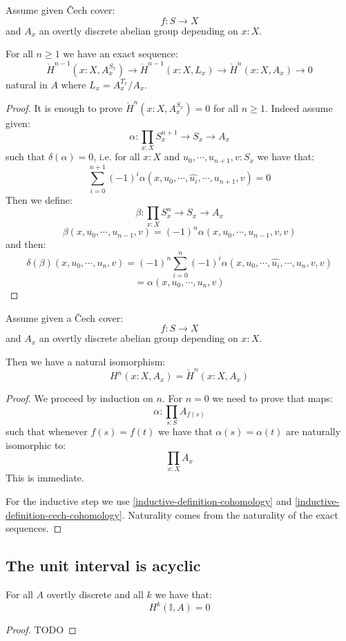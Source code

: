 \begin{lemma}\label{inductive-definition-cech-cohomology}
Assume given \v{C}ech cover:
\[f:S\to X\]
and $A_x$ an overtly discrete abelian group depending on $x:X$.

For all $n\geq 1$ we have an exact sequence:
\[\check{H}^{n-1}(x:X,A_x^{S_x}) \to \check{H}^{n-1}(x:X,L_x)\to \check{H}^n(x:X,A_x)\to 0\]
natural in $A$ where $L_x=A_x^{T_x}/A_x$.
\end{lemma}

\begin{proof}
It is enough to prove $\check{H}^n(x:X,A_x^{S_x}) = 0$ for all $n\geq 1$. Indeed assume given:
\[\alpha : \prod_{x:X} S_x^{n+1}\to S_x\to A_x\]
such that $\delta(\alpha) = 0$, i.e. for all $x:X$ and $u_0,\cdots, u_{n+1},v:S_x$ we have that:
\[\sum_{i=0}^{n+1}(-1)^i\alpha(x,u_0,\cdots,  \hat{u_i},\cdots ,u_{n+1},v) = 0\]
Then we define:
\[\beta : \prod_{x:X} S_x^{n}\to S_x\to A_x\]
\[\beta(x,u_0,\cdots,u_{n-1},v) = (-1)^n\alpha(x,u_0,\cdots,u_{n-1},v,v)\]
and then:
\[\delta(\beta)(x,u_0,\cdots,u_{n},v) = (-1)^n\sum_{i=0}^{n} (-1)^i \alpha(x,u_0,\cdots,\hat{u_i},\cdots,u_n,v,v) \]
\[= \alpha(x,u_0,\cdots,u_n,v)\]
\end{proof}

\begin{theorem}
Assume given a \v{C}ech cover:
\[f:S\to X\]
and $A_x$ an overtly discrete abelian group depending on $x:X$.

Then we have a natural isomorphism:
\[H^n(x:X,A_x) = \check{H}^n(x:X,A_x)\]
\end{theorem}

\begin{proof}
We proceed by induction on $n$. For $n=0$ we need to prove that maps:
\[\alpha:\prod_{s:S}A_{f(s)}\]
such that whenever $f(s)=f(t)$ we have that $\alpha(s) = \alpha(t)$ are naturally isomorphic to:
\[\prod_{x:X}A_x\]
This is immediate.

For the inductive step we use \cref{inductive-definition-cohomology} and \cref{inductive-definition-cech-cohomology}. Naturality comes from the naturality of the exact sequences.
\end{proof}


\subsection{The unit interval is acyclic}

\begin{proposition}\label{vanishing-cohomology-interval}
For all $A$ overtly discrete and all $k$ we have that:
\[H^k(\mathbb{I},A) = 0\]
\end{proposition}

\begin{proof}
TODO
\end{proof}
